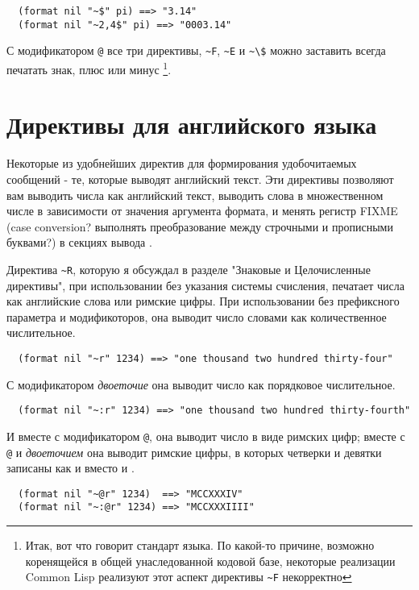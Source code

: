 {\begin{verbatim}
  (format nil "~$" pi) ==> "3.14"
  (format nil "~2,4$" pi) ==> "0003.14"
\end{verbatim}

С модификатором \lstinline!@! все три директивы, \lstinline!~F!, \lstinline!~E! и
\lstinline!~\$! можно заставить всегда печатать знак, плюс или минус \footnote{Итак, вот
  что говорит стандарт языка. По какой-то причине, возможно коренящейся в общей
  унаследованной кодовой базе, некоторые реализации Common Lisp реализуют этот аспект
  директивы \lstinline!~F! некорректно}.

\section{Директивы для английского языка}

Некоторые из удобнейших директив  для формирования удобочитаемых сообщений -
те, которые выводят английский текст. Эти директивы позволяют вам выводить числа как
английский текст, выводить слова в множественном числе в зависимости от значения аргумента
формата, и менять регистр FIXME (case conversion?  выполнять преобразование между
строчными и прописными буквами?) в секциях вывода .

Директива \lstinline!~R!, которую я обсуждал в разделе "Знаковые и Целочисленные
директивы", при использовании без указания системы счисления, печатает числа как
английские слова или римские цифры. При использовании без префиксного параметра и
модификоторов, она выводит число словами как количественное числительное.

\begin{verbatim}
  (format nil "~r" 1234) ==> "one thousand two hundred thirty-four"
\end{verbatim}

С модификатором \textit{двоеточие} она выводит число как порядковое числительное.

\begin{verbatim}
  (format nil "~:r" 1234) ==> "one thousand two hundred thirty-fourth"
\end{verbatim}

И вместе с модификатором \lstinline!@!, она выводит число в виде римских цифр; вместе с
\lstinline!@! и \textit{двоеточием} она выводит римские цифры, в которых четверки и
девятки записаны как  и  вместо  и .

\begin{verbatim}
  (format nil "~@r" 1234)  ==> "MCCXXXIV"
  (format nil "~:@r" 1234) ==> "MCCXXXIIII"
\end{verbatim}

}
